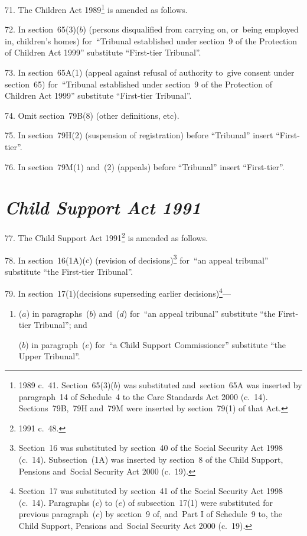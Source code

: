 \documentclass[12pt,a4paper]{article}
\begin{document}
71.  The Children Act 1989\footnote{1989 c.~41. Section~65(3)($b$) was substituted and~section~65A was inserted by paragraph~14 of Schedule~4 to the Care Standards Act 2000 (c.~14). Sections~79B,~79H and~79M were inserted by section~79(1) of that Act.} is amended as follows.

\medskip

72.  In section~65(3)($b$)  (persons disqualified from carrying on, or~being employed in, children’s homes) for~“Tribunal established under section~9 of the Protection of Children Act 1999” substitute “First-tier Tribunal”.

\medskip

73.  In section~65A(1) (appeal against refusal of authority to~give consent under section~65) for~“Tribunal established under section~9 of the Protection of Children Act 1999” substitute “First-tier Tribunal”.

\medskip

74.  Omit section~79B(8) (other definitions, etc).

\medskip

75.  In section~79H(2) (suspension of registration) before “Tribunal” insert “First-tier”.

\medskip

76.  In section~79M(1) and~(2) (appeals) before “Tribunal” insert “First-tier”.

\section*{\itshape Child Support Act 1991}

77.  The Child Support Act 1991\footnote{1991 c.~48.} is amended as follows.

\medskip

78.  In section~16(1A)($c$)  (revision of decisions)\footnote{Section~16 was substituted by section~40 of the Social Security Act 1998 (c.~14). Subsection~(1A) was inserted by section~8 of the Child Support, Pensions and~Social Security Act 2000 (c.~19).} for~“an appeal tribunal” substitute “the First-tier Tribunal”.

\medskip

79.  In section~17(1)(decisions superseding earlier decisions)\footnote{Section~17 was substituted by section~41 of the Social Security Act 1998 (c.~14). Paragraphs ($c$) to ($e$) of subsection~17(1) were substituted for previous paragraph~($c$) by section~9 of, and~Part I of Schedule~9 to, the Child Support, Pensions and~Social Security Act 2000 (c.~19).}—
\begin{enumerate}\item[]
($a$) in paragraphs~($b$)  and~($d$)  for~“an appeal tribunal” substitute “the First-tier Tribunal”; and

($b$) in paragraph~($e$)  for~“a Child Support Commissioner” substitute “the Upper Tribunal”.
\end{enumerate}
\end{document}

